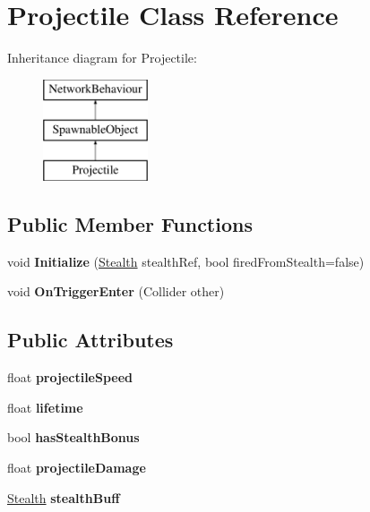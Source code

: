 \hypertarget{class_projectile}{}\section{Projectile Class Reference}
\label{class_projectile}
Inheritance diagram for Projectile\+:\begin{figure}[H]
\begin{center}
\leavevmode
\includegraphics[height=3.000000cm]{class_projectile}
\end{center}
\end{figure}
\subsection*{Public Member Functions}
\begin{DoxyCompactItemize}
\item 
\hypertarget{class_projectile_a0c45c2b66f6d49d5f5ddde384158530c}{}\label{class_projectile_a0c45c2b66f6d49d5f5ddde384158530c} 
void {\bfseries Initialize} (\hyperlink{class_stealth}{Stealth} stealth\+Ref, bool fired\+From\+Stealth=false)
\item 
\hypertarget{class_projectile_a637afe762aba2b53b63778df6568273b}{}\label{class_projectile_a637afe762aba2b53b63778df6568273b} 
void {\bfseries On\+Trigger\+Enter} (Collider other)
\end{DoxyCompactItemize}
\subsection*{Public Attributes}
\begin{DoxyCompactItemize}
\item 
\hypertarget{class_projectile_ad6225e78516f5faee4d0258cff7c8ce8}{}\label{class_projectile_ad6225e78516f5faee4d0258cff7c8ce8} 
float {\bfseries projectile\+Speed}
\item 
\hypertarget{class_projectile_a3dc9d0d2d4708677d3141c56de2203fc}{}\label{class_projectile_a3dc9d0d2d4708677d3141c56de2203fc} 
float {\bfseries lifetime}
\item 
\hypertarget{class_projectile_aca3c4f25231bae882fe2a2a37ff0e9f0}{}\label{class_projectile_aca3c4f25231bae882fe2a2a37ff0e9f0} 
bool {\bfseries has\+Stealth\+Bonus}
\item 
\hypertarget{class_projectile_a71b35f5ecd343a827bbae4b10ff7c295}{}\label{class_projectile_a71b35f5ecd343a827bbae4b10ff7c295} 
float {\bfseries projectile\+Damage}
\item 
\hypertarget{class_projectile_a8cd801b26d0f50d2346eaa080ed04227}{}\label{class_projectile_a8cd801b26d0f50d2346eaa080ed04227} 
\hyperlink{class_stealth}{Stealth} {\bfseries stealth\+Buff}
\end{DoxyCompactItemize}
